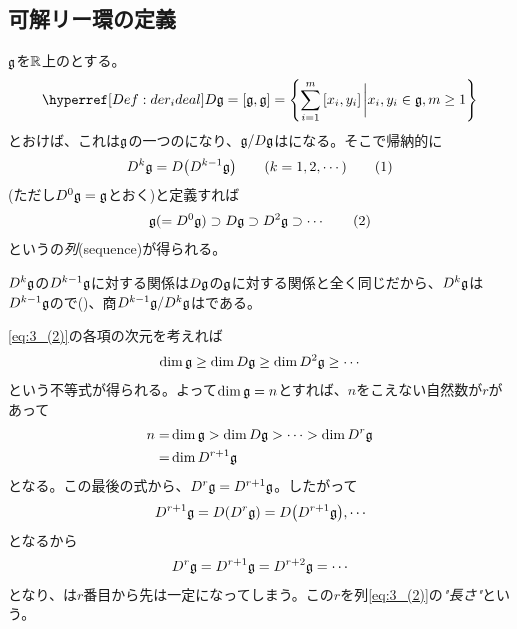 \documentclass[../main]{subfiles}
\begin{document}
\subsection{可解リー環の定義}
\begin{definition}[列]\label{Def:sequence}
  $\mathfrak{g}$を{}$\mathbb{R}$上の{}とする。
  \begin{align*}
    \href{Def:der_ideal}{D\g}=\comm{\g}{\g}=\qty{\sum_{i=1}^{m}\comm{x_{i}}{y_{i}}\eval x_{i},y_{i}\in\g, m\ge1}
  \end{align*}
  とおけば、これは$\mathfrak{g}$の一つの{}になり、{}$\mathfrak{g}/D\mathfrak{g}$は{}になる。そこで帰納的に
  \begin{align*}
    D^{k}\g=D\qty(D^{k-1}\g)\qq{}(k=1,2,\cdots)
    \tag{1}\label{eq:3_(1)}
  \end{align*}
  (ただし$D^{0}\mathfrak{g}=\mathfrak{g}$とおく)と定義すれば
  \begin{align*}
    \mathfrak{g}(=D^{0}\mathfrak{g})\supset D\mathfrak{g} \supset D^{2}\mathfrak{g} \supset \cdots
    \tag{2}\label{eq:3_(2)}
  \end{align*}
  という{}の\emph{列}(sequence)が得られる。
\end{definition}

\begin{remark}
  $D^{k}\mathfrak{g}$の$D^{k-1}\mathfrak{g}$に対する関係は$D\mathfrak{g}$の$\mathfrak{g}$に対する関係と全く同じだから、$D^{k}\mathfrak{g}$は$D^{k-1}\mathfrak{g}$の{}で()、商$D^{k-1}\mathfrak{g}/D^{k}\mathfrak{g}$は{}である。
\end{remark}

\begin{named}\label{nam:seq_length}
  \eqref{eq:3_(2)}の各項の次元を考えれば
  \begin{align*}
    \dim\mathfrak{g} \ge \dim D\mathfrak{g} \ge \dim D^2\mathfrak{g} \ge \cdots
  \end{align*}
  という不等式が得られる。よって$\dim\mathfrak{g}=n$とすれば、$n$をこえない自然数が$r$があって
  \begin{align*}
    n=&\dim\mathfrak{g}>\dim D\mathfrak{g} > \cdots > \dim D^{r}\mathfrak{g}\\
    =& \dim D^{r+1}\mathfrak{g}
  \end{align*}
  となる。この最後の式から、$D^{r}\mathfrak{g}=D^{r+1}\mathfrak{g}$。したがって
  \begin{align*}
    D^{r+1}\mathfrak{g} = D\qty(D^{r}\mathfrak{g})=D\qty(D^{r+1}\mathfrak{g}),\cdots
  \end{align*}
  となるから
  \begin{align*}
    D^{r}\mathfrak{g}=D^{r+1}\mathfrak{g} = D^{r+2}\mathfrak{g}=\cdots
  \end{align*}
  となり、{\列}は$r$番目から先は一定になってしまう。この$r$を列\eqref{eq:3_(2)}の\emph{"長さ"}という。
\end{named}
\end{document}
